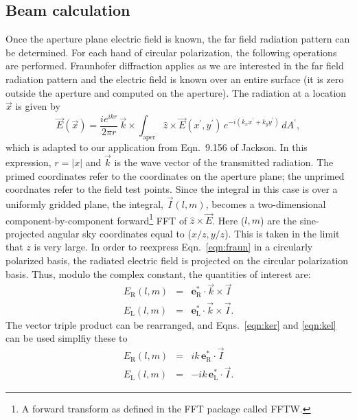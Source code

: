 \documentclass{article}
\begin{document}
\subsection{Beam calculation} \label{sec:beam}

Once the aperture plane electric field
is known, the far field radiation pattern can be 
determined.  For each hand of circular polarization, the following operations
are performed.  Fraunhofer diffraction applies as we are interested in the 
far field radiation pattern and the electric field is known over an 
entire surface (it is zero outside the aperture and computed on the aperture).
The radiation at a location $\vec{x}$ is given by
\begin{equation} \label{eqn:fraun}
\vec{E}(\vec{x}) = \frac{i e^{ikr}}{2 \pi r} \, \vec{k} \times
\int_\mathrm{aper} \hat{z} \times \vec{E}(x^\prime, y^\prime) 
\, e^{-i(k_x x^\prime + k_y y^\prime)} \, dA^\prime,
\end{equation}
which is adapted to our application from Eqn.~9.156 of Jackson.  In this
expression, $r = |x|$ and $\vec{k}$ is the wave vector of the transmitted
radiation.  The primed coordinates refer to the coordinates on the
aperture plane; the unprimed coordnates refer to the field test points.
Since the integral in this case is over a uniformly gridded
plane, the integral, $\vec{I}(l, m)$, 
becomes a two-dimensional component-by-component 
forward\footnote{A forward transform as defined in the FFT package called 
FFTW.} FFT
of $\hat{z} \times \vec{E}$.  Here ($l, m$) are the 
sine-projected
angular sky coordinates
equal to ($x/z, y/z$).  This is taken in the limit that $z$ is very large.
In order to reexpress Eqn.~\ref{eqn:fraun} in a circularly 
polarized basis, the radiated electric field is projected on the 
circular polarization basis.  Thus, modulo the complex constant,
the quantities of interest are:
\begin{eqnarray}
E_\mathrm{R}(l, m) & = & \mathbf{e}_\mathrm{R}^* \cdot \vec{k} \times \vec{I} \\
E_\mathrm{L}(l, m) & = & \mathbf{e}_\mathrm{L}^* \cdot \vec{k} \times \vec{I} .
\end{eqnarray}
The vector triple product can be rearranged, and Eqns.~\ref{eqn:ker} and
\ref{eqn:kel} can be used simplfiy these to
\begin{eqnarray}
E_\mathrm{R}(l, m) & = & ik\,\mathbf{e}_\mathrm{R}^* \cdot \vec{I} \\
E_\mathrm{L}(l, m) & = & -ik\,\mathbf{e}_\mathrm{L}^* \cdot \vec{I}.
\end{eqnarray}
\end{document}
